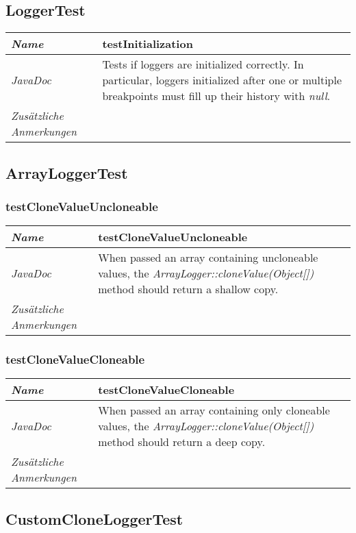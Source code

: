 \documentclass[a4paper]{report}
\begin{document}
\renewcommand{\arraystretch}{1.5}
\subsection{LoggerTest}
\begin{tabular}{p{2.3cm}  p{11.5cm}}
  \hline
 \textit{Name} & testInitialization\\
  \hline
 \textit{JavaDoc} & Tests if loggers are initialized correctly.
	 In particular, loggers initialized after one or multiple breakpoints must fill up their history with \emph{null}.\\
  \hline
 \textit{Zusätzliche Anmerkungen} & \\
  \hline
\end{tabular}

\subsection{ArrayLoggerTest}

\subsubsection{testCloneValueUncloneable}
\begin{tabular}{p{2.3cm}  p{11.5cm}}
  \hline
 \textit{Name} & testCloneValueUncloneable\\
  \hline
 \textit{JavaDoc} & When passed an array containing uncloneable values, the \emph{ArrayLogger::cloneValue(Object[])} method should return a shallow copy.\\
  \hline
 \textit{Zusätzliche Anmerkungen} & \\
  \hline
\end{tabular}

\subsubsection{testCloneValueCloneable}
\begin{tabular}{p{2.3cm}  p{11.5cm}}
  \hline
 \textit{Name} & testCloneValueCloneable\\
  \hline
 \textit{JavaDoc} & When passed an array containing only cloneable values, the \emph{ArrayLogger::cloneValue(Object[])} method should return a deep copy.\\
  \hline
 \textit{Zusätzliche Anmerkungen} & \\
  \hline
\end{tabular}

\subsection{CustomCloneLoggerTest}
\end{document}
